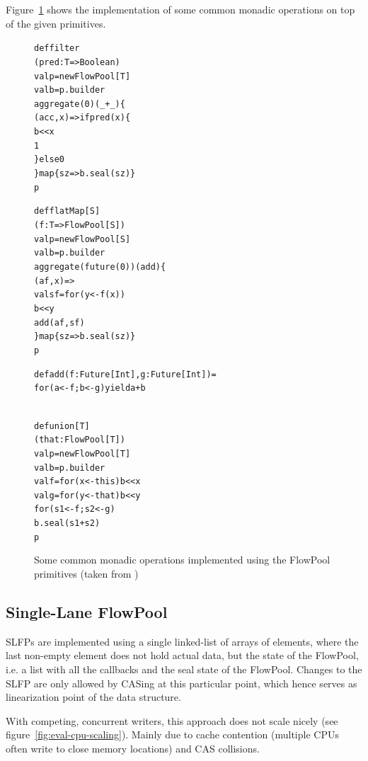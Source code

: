 \documentclass[runningheads,a4paper,fleqn]{llncs}
\begin{document}
Figure~\ref{fig:mon-impl} shows the implementation of some common
monadic operations on top of the given primitives.
\begin{figure}
\begin{minipage}[t]{4 cm}
\begin{alltt}
{\scriptsize
def filter
  (pred: T => Boolean)
  val p = new FlowPool[T]
  val b = p.builder
  aggregate(0)(_ + _) \{
    (acc, x) => if pred(x) \{
      b << x
      1
    \} else 0
  \} map \{ sz => b.seal(sz) \}
  p



}
\end{alltt}
\end{minipage}\begin{minipage}[t]{4 cm}
\begin{alltt}
{\scriptsize
def flatMap[S]
  (f: T => FlowPool[S])
  val p = new FlowPool[S]
  val b = p.builder
  aggregate(future(0))(add) \{
    (af, x) =>
    val sf = for (y <- f(x))
      b << y
    add(af, sf)
  \} map \{ sz => b.seal(sz) \}
  p

def add(f: Future[Int], g: Future[Int]) =
  for (a <- f; b <- g) yield a + b
}
\end{alltt}
\end{minipage}
\begin{minipage}[t]{4 cm}
\begin{alltt}
{\scriptsize
def union[T]
  (that: FlowPool[T])
  val p = new FlowPool[T]
  val b = p.builder
  val f = for (x <- this) b << x
  val g = for (y <- that) b << y
  for (s1 <- f; s2 <- g)
    b.seal(s1 + s2)
  p
}
\end{alltt}
\end{minipage}

\caption{Some common monadic operations implemented using the FlowPool
  primitives (taken from \cite{FP12})} \label{fig:mon-impl}
\end{figure}


\subsection{Single-Lane FlowPool}
SLFPs are implemented using a single linked-list of arrays of
elements, where the last non-empty element does not hold actual data,
but the state of the FlowPool, i.e. a list with all the callbacks and
the seal state of the FlowPool. Changes to the SLFP are only allowed
by CASing at this particular point, which hence serves as
linearization point of the data structure.

With competing, concurrent writers, this approach does not scale
nicely (see figure~\ref{fig:eval-cpu-scaling}). Mainly due to cache
contention (multiple CPUs often write to close memory locations) and
CAS collisions.
\end{document}
